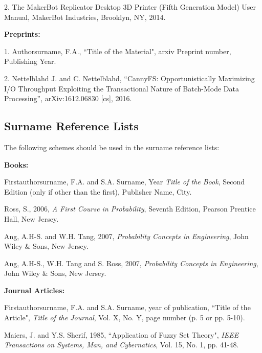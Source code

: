 \documentclass[a4paper,oneside,12pt]{report}
\numberwithin{equation}{chapter}
\begin{document}
\begin{flushleft}
\leftskip 5mm \parindent -5mm 2. The MakerBot Replicator Desktop 3D Printer (Fifth Generation Model) User Manual, MakerBot Industries, Brooklyn, NY, 2014.\newline


\leftskip 5mm \parindent -5mm \textbf{Preprints:}

\leftskip 5mm \parindent -5mm 1. Authorsurname, F.A., ``Title of the 
Material", arxiv Preprint number, Publishing Year.

\leftskip 5mm \parindent -5mm 2. Nettelblahd J. and C. Nettelblahd, “CannyFS: Opportunistically Maximizing I/O Throughput Exploiting the Transactional Nature of Batch-Mode Data Processing”, arXiv:1612.06830 [cs], 2016.\newline
\end{flushleft}

\subsection{Surname Reference Lists}

The following schemes should be used in the surname reference lists:\newline


\leftskip 5mm \parindent -5mm \textbf{Books:}

\leftskip 5mm \parindent -5mm Firstauthorsurname, F.A. and S.A. Surname, Year \textit{Title of the Book}, Second Edition (only if other than the first), Publisher Name, City.

\leftskip 5mm \parindent -5mm Ross, S., 2006, \textit{A First Course in Probability}, Seventh Edition, Pearson Prentice Hall, New Jersey.

\leftskip 5mm \parindent -5mm Ang, A.H-S. and W.H. Tang, 2007, \textit{Probability Concepts in Engineering}, John Wiley \& Sons, New Jersey.

\leftskip 5mm \parindent -5mm Ang, A.H-S., W.H. Tang and S. Ross, 2007, \textit{Probability Concepts in Engineering}, John Wiley \& Sons, New Jersey.\newline


\leftskip 5mm \parindent -5mm \textbf{Journal Articles:}

\leftskip 5mm \parindent -5mm Firstauthorsurname, F.A. and S.A. Surname, year of publication, ``Title of the Article", \textit{Title of the Journal}, Vol. X, No. Y, page number (p. 5 or pp. 5-10).

\leftskip 5mm \parindent -5mm Maiers, J. and Y.S. Sherif, 1985, ``Application of Fuzzy Set Theory", \textit{IEEE Transactions on Systems, Man, and Cybernatics}, Vol. 15, No. 1, pp. 41-48.\newline
\end{document}
